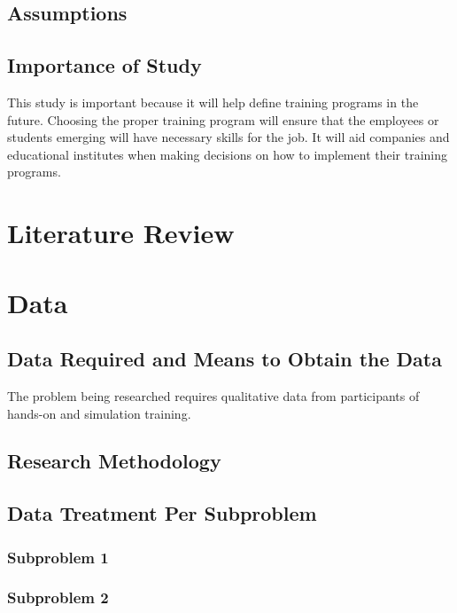 \documentclass[titlepage]{article}
\begin{document}
\subsection{Assumptions}

\subsection{Importance of Study}
This study is important because it will help define training programs in the future.
Choosing the proper training program will ensure that the employees or students emerging
will have necessary skills for the job.  It will aid companies and educational institutes
when making decisions on how to implement their training programs.

\clearpage

\section{Literature Review}

\clearpage

\section{Data}

\subsection{Data Required and Means to Obtain the Data}
The problem being researched requires qualitative data from participants of hands-on
and simulation training.  

\subsection{Research Methodology}

\subsection{Data Treatment Per Subproblem}

\subsubsection{Subproblem 1}

\subsubsection{Subproblem 2}
\end{document}

